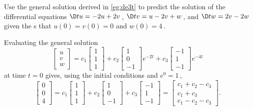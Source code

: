 \begin{example} 
Use the general solution derived in \cref{eg:de3t} to predict the solution of the differential equations \(\D tu=-2u+2v\)\,, \(\D tv=u-2v+w\)\,, and \(\D tw=2v-2w\) given the s that \(u(0)=v(0)=0\) and \(w(0)=4\)\,.
\begin{solution} 
Evaluating the general solution
\begin{equation*}
\begin{bmatrix} u\\v\\w \end{bmatrix}
=c_1\begin{bmatrix} 1\\1\\1 \end{bmatrix}
+c_2\begin{bmatrix} 1\\0\\-1 \end{bmatrix}e^{-2t}
+c_3\begin{bmatrix} -1\\1\\-1 \end{bmatrix}e^{-4t}
\end{equation*}
at time \(t=0\) gives, using the initial conditions and \(e^0=1\)\,,
\begin{equation*}
\begin{bmatrix} 0\\0\\4 \end{bmatrix}
=c_1\begin{bmatrix} 1\\1\\1 \end{bmatrix}
+c_2\begin{bmatrix} 1\\0\\-1 \end{bmatrix}
+c_3\begin{bmatrix} -1\\1\\-1 \end{bmatrix}
=\begin{bmatrix} c_1+c_2-c_3\\c_1+c_3\\c_1-c_2-c_3 \end{bmatrix}.
\end{equation*}



\end{solution}
\end{example}
